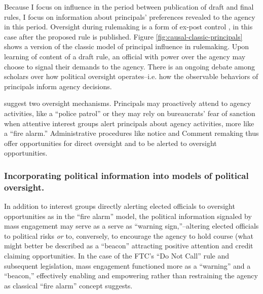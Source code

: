 
Because I focus on influence in the period between publication of draft and final rules, I focus on information about principals' preferences revealed to the agency in this period. Oversight during rulemaking is a form of ex-post control \citep{Epstein1994}, in this case after the proposed rule is published. Figure \ref{fig:causal-classic-principals} shows a version of the classic model of principal influence in rulemaking. Upon learning of content of a draft rule, an official with power over the agency may choose to signal their demands to the agency. There is an ongoing debate among scholars over how political oversight operates--i.e. how the observable behaviors of principals inform agency decisions. 



\citet{McCubbins1987} suggest two oversight mechanisms. Principals may proactively attend to agency activities, like a ``police patrol'' or they may rely on bureaucrats' fear of sanction when attentive interest groups alert principals about agency activities, more like a ``fire alarm.'' Administrative procedures like notice and Comment remaking thus offer opportunities for direct oversight and to be alerted to oversight opportunities.


\subsubsection{Incorporating political information into models of political oversight.}
In addition to interest groups directly alerting elected officials to oversight opportunities as in the ``fire alarm'' model,
the political information signaled by mass engagement may serve as a serve as ``warning sign,''--altering elected officials to political risks
\emph{or} to, conversely, to encourage the agency to hold course (what might better be described as a ``beacon'' attracting positive attention and credit claiming opportunities. In the case of the FTC's ``Do Not Call'' rule and subsequent legislation, mass engagement functioned more as a ``warning'' and a ``beacon,'' effectively enabling and empowering rather than restraining the agency as classical ``fire alarm'' concept suggests.

